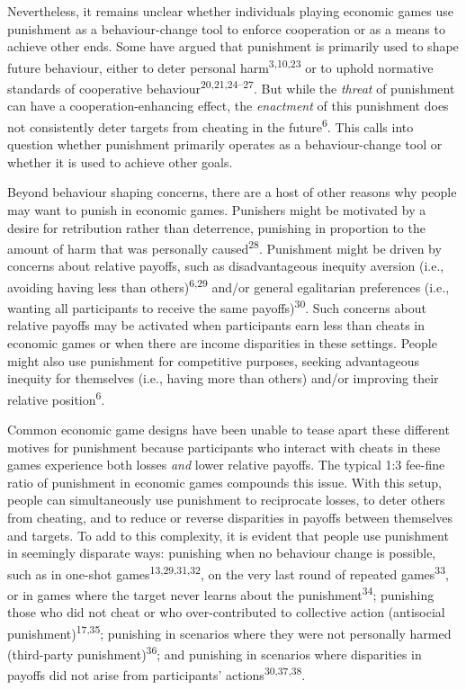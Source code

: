 \documentclass[
  english,
  man, donotrepeattitle,floatsintext]{apa6}
\begin{document}
Nevertheless, it remains unclear whether individuals playing economic games use
punishment as a behaviour-change tool to enforce cooperation or as a means to
achieve other ends. Some have argued that punishment is primarily used to shape
future behaviour, either to deter personal harm\textsuperscript{3,10,23} or to uphold normative standards of cooperative behaviour\textsuperscript{20,21,24--27}.
But while the \emph{threat} of punishment can have a cooperation-enhancing effect,
the \emph{enactment} of this punishment does not consistently deter targets from
cheating in the future\textsuperscript{6}. This calls into question whether
punishment primarily operates as a behaviour-change tool or whether it is used
to achieve other goals.

Beyond behaviour shaping concerns, there are a host of other reasons why people
may want to punish in economic games. Punishers might be motivated by a desire
for retribution rather than deterrence, punishing in proportion to the amount
of harm that was personally caused\textsuperscript{28}. Punishment might be driven
by concerns about relative payoffs, such as disadvantageous inequity aversion
(i.e., avoiding having less than others)\textsuperscript{6,29} and/or
general egalitarian preferences (i.e., wanting all participants to receive the
same payoffs)\textsuperscript{30}. Such concerns about relative payoffs may be activated
when participants earn less than cheats in economic games or when there are
income disparities in these settings. People might also use punishment for
competitive purposes, seeking advantageous inequity for themselves (i.e., having
more than others) and/or improving their relative position\textsuperscript{6}.

Common economic game designs have been unable to tease apart these different
motives for punishment because participants who interact with cheats in these
games experience both losses \emph{and} lower relative payoffs. The typical 1:3
fee-fine ratio of punishment in economic games compounds this issue. With
this setup, people can simultaneously use punishment to reciprocate losses, to
deter others from cheating, and to reduce or reverse disparities in payoffs
between themselves and targets. To add to this complexity, it is evident that
people use punishment in seemingly disparate ways: punishing when no behaviour
change is possible, such as in one-shot games\textsuperscript{13,29,31,32}, on the very last round of repeated games\textsuperscript{33}, or in games where the target never learns about the
punishment\textsuperscript{34}; punishing those who did not cheat or who
over-contributed to collective action (antisocial punishment)\textsuperscript{17,35}; punishing in scenarios where they were not
personally harmed (third-party punishment)\textsuperscript{36}; and punishing in
scenarios where disparities in payoffs did not arise from participants'
actions\textsuperscript{30,37,38}.
\end{document}
